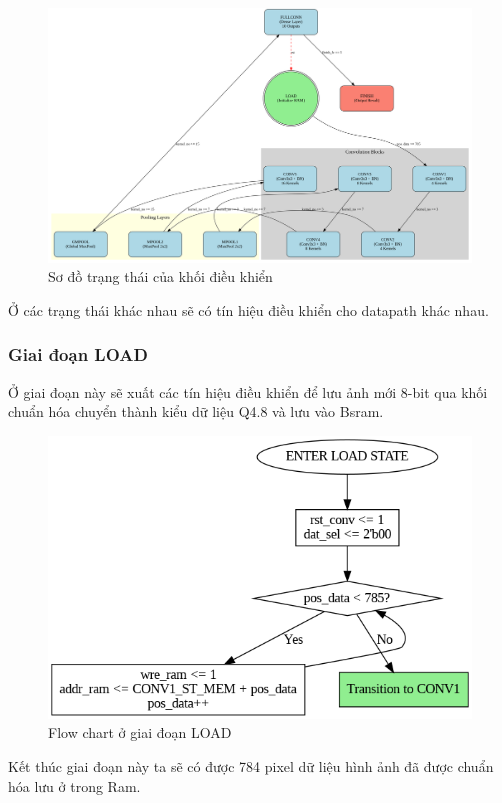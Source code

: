 \begin{figure}[H]
    \centering
    \includegraphics[width=0.9\linewidth]{Images/fsm.png}
    \caption{Sơ đồ trạng thái của khối điều khiển}
    \label{fig:enter-label}
\end{figure}
Ở các trạng thái khác nhau sẽ có tín hiệu điều khiển cho datapath khác nhau.

\subsubsection{Giai đoạn LOAD}
Ở giai đoạn này sẽ xuất các tín hiệu điều khiển để lưu ảnh mới 8-bit qua khối chuẩn hóa chuyển thành kiểu dữ liệu Q4.8 và lưu vào Bsram.
\begin{figure}[H]
    \centering
    \includegraphics[width=0.75\linewidth]{Images/loadflow.png}
    \caption{Flow chart ở giai đoạn LOAD}
    \label{fig:enter-label}
\end{figure}

Kết thúc giai đoạn này ta sẽ có được 784 pixel dữ liệu hình ảnh đã được chuẩn hóa lưu ở trong Ram.

